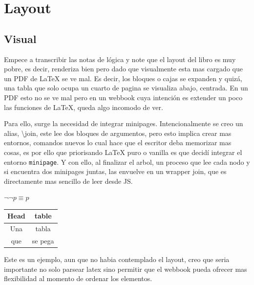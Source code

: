   \chapter { Layout }

  \section{ Visual }

  Empece a transcribir las notas de lógica y note que el layout del libro es muy pobre,
  es decir, renderiza bien pero dado que visualmente esta mas cargado que un PDF de
  LaTeX se ve mal. Es decir, los bloques o cajas se expanden y quizá, una tabla que
  solo ocupa un cuarto de pagina se visualiza abajo, centrada. En un PDF esto no se
  ve mal pero en un webbook cuya intención es extender un poco las funciones de LaTeX,
  queda algo incomodo de ver.

  Para ello, surge la necesidad de integrar minipages. Intencionalmente se creo un
  alias, \backslash join, este lee dos bloques de argumentos, pero esto implica
  crear mas entornos, comandos nuevos lo cual hace que el escritor deba memorizar
  mas cosas, es por ello que priorisando LaTeX puro o vanilla es que decidí integrar
  el entorno \texttt{minipage}. Y con ello, al finalizar el arbol, un proceso que
  lee cada nodo y si encuentra dos minipages juntas, las envuelve en un wrapper
  join, que es directamente mas sencillo de leer desde JS.

  \begin{minipage}[t]{0.48\textwidth}
    \begin{axiom}[title=Doble negación]
      $\lnot\lnot p \equiv p$
    \end{axiom}
  \end{minipage}\hfill

  \begin{minipage}[t]{0.48\textwidth}
    \begin{tabular}{cc}
      Head & table \\
      \hline
      Una & tabla \\
      que & se pega
    \end{tabular}
  \end{minipage}

  Este es un ejemplo, aun que no habia contemplado el layout, creo que seria importante
  no solo parsear latex sino permitir que el webbook pueda ofrecer mas flexibilidad
  al momento de ordenar los elementos.

